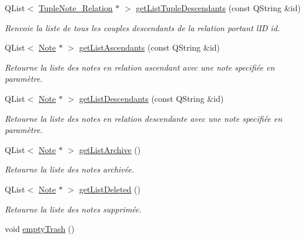 \begin{DoxyCompactItemize}
Q\+List$<$ \hyperlink{class_tuple_note___relation}{Tuple\+Note\+\_\+\+Relation} $\ast$ $>$ \hyperlink{class_notes_manager_a4b8636fd8bc9d750d778585d3e4372cf}{get\+List\+Tuple\+Descendants} (const Q\+String \&id)
\begin{DoxyCompactList}\small\item\em Renvoie la liste de tous les couples descendants de la relation portant l\textquotesingle{}ID id. \end{DoxyCompactList}\item 
Q\+List$<$ \hyperlink{class_note}{Note} $\ast$ $>$ \hyperlink{class_notes_manager_ac85019776c1e8653665e24abc9d8001d}{get\+List\+Ascendants} (const Q\+String \&id)
\begin{DoxyCompactList}\small\item\em Retourne la liste des notes en relation ascendant avec une note specifiée en paramètre. \end{DoxyCompactList}\item 
Q\+List$<$ \hyperlink{class_note}{Note} $\ast$ $>$ \hyperlink{class_notes_manager_a2ed035544b433b9cddfc83fb4c081a65}{get\+List\+Descendants} (const Q\+String \&id)
\begin{DoxyCompactList}\small\item\em Retourne la liste des notes en relation descendante avec une note specifiée en paramètre. \end{DoxyCompactList}\item 
\mbox{\label{class_notes_manager_a81aee1d57c39232f870199acb356fc57}} 
Q\+List$<$ \hyperlink{class_note}{Note} $\ast$ $>$ \hyperlink{class_notes_manager_a81aee1d57c39232f870199acb356fc57}{get\+List\+Archive} ()
\begin{DoxyCompactList}\small\item\em Retourne la liste des notes archivée. \end{DoxyCompactList}\item 
\mbox{\label{class_notes_manager_ae6b144ba1bc14b895be36b194a2e768e}} 
Q\+List$<$ \hyperlink{class_note}{Note} $\ast$ $>$ \hyperlink{class_notes_manager_ae6b144ba1bc14b895be36b194a2e768e}{get\+List\+Deleted} ()
\begin{DoxyCompactList}\small\item\em Retourne la liste des notes supprimée. \end{DoxyCompactList}\item 
void \hyperlink{class_notes_manager_a84e962ad7fa999cbb687fb43c1b3bab4}{empty\+Trash} ()

\end{DoxyCompactItemize}
